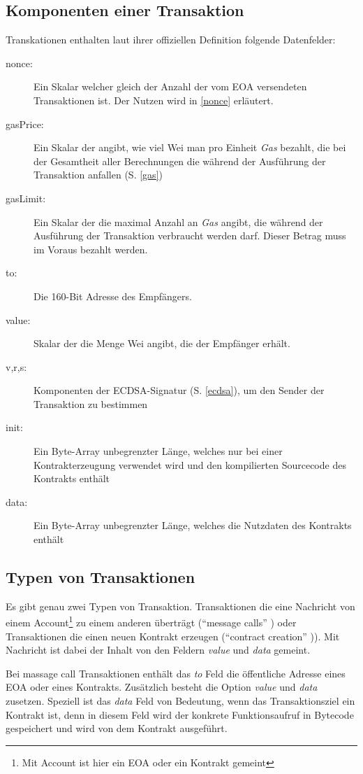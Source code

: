 \documentclass[runningheads]{llncs}
\begin{document}
\subsection{Komponenten einer Transaktion}
\label{komponenten}
Transkationen enthalten laut ihrer offiziellen Definition \cite[S. 4]{wood_ethereum/yellowpaper_2019} folgende Datenfelder:
\begin{description}
  \item[nonce:] Ein Skalar welcher gleich der Anzahl der vom EOA versendeten Transaktionen ist. Der Nutzen wird in \ref{nonce} erläutert.
  \item[gasPrice:] Ein Skalar der angibt, wie viel Wei man pro Einheit \textit{Gas} bezahlt, die bei der Gesamtheit aller Berechnungen die während der Ausführung der Transaktion anfallen (S. \ref{gas})
  \item[gasLimit:] Ein Skalar der die maximal Anzahl an \textit{Gas} angibt, die während der Ausführung der Transaktion verbraucht werden darf. Dieser Betrag muss im Voraus bezahlt werden.
  \item[to:] Die 160-Bit Adresse des Empfängers.
  \item[value:] Skalar der die Menge Wei angibt, die der Empfänger erhält.
  \item[v,r,s:] Komponenten der ECDSA-Signatur (S. \ref{ecdsa}), um den Sender der Transaktion zu bestimmen
  \item[init:] Ein Byte-Array unbegrenzter Länge, welches nur bei einer Kontrakterzeugung verwendet wird und den kompilierten Sourcecode des Kontrakts enthält
  \item[data:] Ein Byte-Array unbegrenzter Länge, welches die Nutzdaten des Kontrakts enthält
\end{description}


\subsection{Typen von Transaktionen}
Es gibt genau zwei Typen von Transaktion. Transaktionen die eine Nachricht von einem Account\footnote{Mit Account ist hier ein EOA oder ein Kontrakt gemeint} zu einem anderen überträgt ("`message calls"' \cite[S. 4]{wood_ethereum/yellowpaper_2019}) oder Transaktionen die einen neuen Kontrakt erzeugen ("`contract creation"' \cite[S. 4]{wood_ethereum/yellowpaper_2019})). Mit Nachricht ist dabei der Inhalt von den Feldern \textit{value} und \textit{data} gemeint.

Bei massage call Transaktionen enthält das \textit{to} Feld die öffentliche Adresse eines EOA oder eines Kontrakts. Zusätzlich besteht die Option \textit{value} und \textit{data} zusetzen. Speziell ist das \textit{data} Feld von Bedeutung, wenn das Transaktionsziel ein Kontrakt ist, denn in diesem Feld wird der konkrete
Funktionsaufruf in Bytecode gespeichert und wird von dem Kontrakt ausgeführt.
\end{document}

